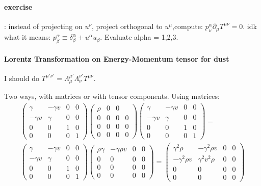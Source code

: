 \paragraph{exercise}: instead of projecting on $u^{\nu  }$, project orthogonal to $u^{\mu }$,compute: $p^{\alpha }_{\nu } \partial_{\mu }T^{\mu \nu }=0$.
idk what it means: $p^{\alpha }_{\beta }\equiv \delta^{\alpha }_{\beta } + u^{\alpha }u_{\beta }$. Evaluate alpha = 1,2,3.

\paragraph{Lorentz Transformation on Energy-Momentum tensor for dust}\label{ex:dustboost}

I should do $T^{\mu \prime \nu \prime } = \Lambda ^{\mu \prime }_{\mu }\Lambda ^{\nu \prime }_{\nu }T^{\mu \nu }$. \par
Two ways, with matrices or with tensor components. Using matrices:
\begin{gather*}
\begin{pmatrix}
\gamma  & -\gamma  v & 0 & 0 \\
-\gamma v & \gamma  & 0 & 0 \\
0 & 0 & 1 & 0 \\
0 & 0 & 0 & 1
\end{pmatrix} \begin{pmatrix}
\rho  & 0 & 0 \\
0 & 0 & 0 & 0 \\
0 & 0 & 0 & 0 \\
0 & 0 & 0 & 0
\end{pmatrix} \begin{pmatrix}
\gamma  & -\gamma  v & 0 & 0 \\
-\gamma v & \gamma  & 0 & 0 \\
0 & 0 & 1 & 0 \\
0 & 0 & 0 & 1
\end{pmatrix} = \\
 \begin{pmatrix}
\gamma  & -\gamma v & 0 & 0 \\
-\gamma v & \gamma  & 0 & 0 \\
0 & 0 & 1 & 0 \\
0 & 0 & 0 & 1
\end{pmatrix} \begin{pmatrix}
\rho \gamma  & -\gamma \rho v & 0 & 0 \\
0 & 0 & 0 & 0 \\
0 & 0 & 0 & 0 \\
0 & 0 & 0 & 0
\end{pmatrix}  = \begin{pmatrix}
\gamma ^{2}\rho  & -\gamma ^{2}\rho v & 0 & 0 \\
-\gamma ^{2}\rho v & \gamma ^{2}v^{2}\rho  & 0 & 0 \\
0 & 0 & 0 & 0 \\
0 & 0 & 0 & 0
\end{pmatrix} 
\end{gather*}
